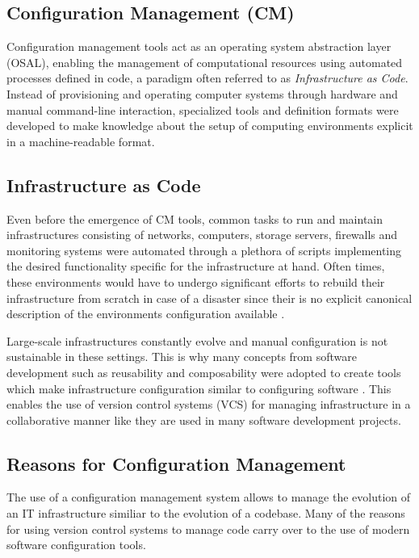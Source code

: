 \subsection{Configuration Management (CM)}

Configuration management tools act as an operating system abstraction layer (OSAL), enabling the management of computational resources using automated processes defined in code, a paradigm often referred to as \textit{Infrastructure as Code}. Instead of provisioning and operating computer systems through hardware and manual command-line interaction, specialized tools and definition formats were developed to make knowledge about the setup of computing environments explicit in a machine-readable format.

\subsection{Infrastructure as Code}

Even before the emergence of CM tools, common tasks to run and maintain infrastructures consisting of networks, computers, storage servers, firewalls and monitoring systems were automated through a plethora of scripts implementing the desired functionality specific for the infrastructure at hand. Often times, these environments would have to undergo significant efforts to rebuild their infrastructure from scratch in case of a disaster since their is no explicit canonical description of the environments configuration available \cite{Hüttermann2012}.

Large-scale infrastructures constantly evolve and manual configuration is not sustainable in these settings. This is why many concepts from software development such as reusability and composability were adopted to create tools which make infrastructure configuration similar to configuring software \cite{kanies2006puppet}. This enables the use of version control systems (VCS) for managing infrastructure in a collaborative manner like they are used in many software development projects.

\subsection{Reasons for Configuration Management}

The use of a configuration management system allows to manage the evolution of an IT infrastructure similiar to the evolution of a codebase. Many of the reasons for using version control systems to manage code \cite{Dart:1991:CCM:111062.111063}\cite{1983ansi} carry over to the use of modern software configuration tools.

